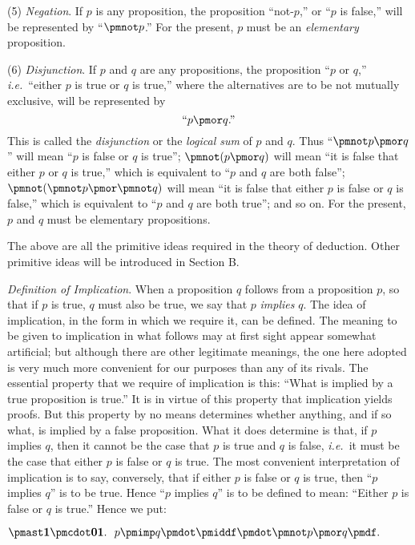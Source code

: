 (5) \textit{Negation}. If $p$ is any proposition, the proposition ``not-$p$,'' or ``$p$ is false,'' will be represented by ``$\pmnot p$.'' For the present, $p$ must be an \textit{elementary} proposition.

(6) \textit{Disjunction}. If $p$ and $q$ are any propositions, the proposition ``$p$ or $q$,'' \textit{i.e.}\ ``either $p$ is true or $q$ is true,'' where the alternatives are to be not mutually exclusive, will be represented by
\[
\text{``}p \pmor q\text{.''}
\]
This is called the \textit{disjunction} or the \textit{logical sum} of $p$ and $q$. Thus ``$\pmnot p \pmor q$'' will mean ``$p$ is false or $q$ is true''; $\pmnot(p \pmor q)$ will mean ``it is false that either $p$ or $q$ is true,'' which is equivalent to ``$p$ and $q$ are both false'';  $\pmnot(\pmnot p \pmor \pmnot q)$ will mean ``it is false that either $p$ is false or $q$ is false,'' which is equivalent to ``$p$ and $q$ are both true''; and so on. For the present, $p$ and $q$ must be elementary propositions.

 The above are all the primitive ideas required in the theory of deduction. Other primitive ideas will be introduced in Section B.

\textit{Definition of Implication}. When a proposition $q$ follows from a proposition $p$, so that if $p$ is true, $q$ must also be true, we say that $p$ \textit{implies} $q$. The idea of implication, in the form in which we require it, can be defined. The meaning to be given to implication in what follows may at first sight appear somewhat artificial; but although there are other legitimate meanings, the one here adopted is very much more convenient for our purposes than any of its rivals. The essential property that we require of implication is this: ``What is implied by a true proposition is true.'' It is in virtue of this property that implication yields proofs. But this property by no means determines whether anything, and if so what, is implied by a false proposition. What it does determine is that, if $p$ implies $q$, then it cannot be the case that $p$ is true and $q$ is false, \textit{i.e.}\ it must be the case that either $p$ is false or $q$ is true. The most convenient interpretation of implication is to say, conversely, that if either $p$ is false or $q$ is true, then ``$p$ implies $q$'' is to be true. Hence ``$p$ implies $q$'' is to be defined to mean: ``Either $p$ is false or $q$ is true.'' Hence we put:
\begin{flushleft}
	\(\boldsymbol{\pmast1\pmcdot01}.\:\:\: p \pmimp q \pmdot \pmiddf \pmdot \pmnot p \pmor q \pmdf.\)
\end{flushleft}


